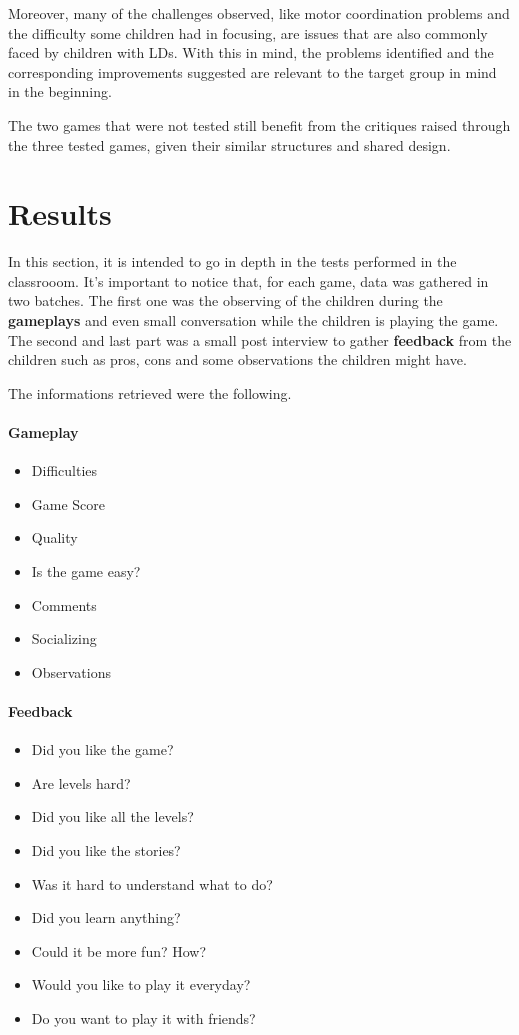 Moreover, many of the challenges observed, like motor coordination problems and the difficulty some children had in focusing, are issues that are also commonly faced by children with LDs. With this in mind, the problems identified and the corresponding improvements suggested are relevant to the target group in mind in the beginning.

The two games that were not tested still benefit from the critiques raised through the three tested games, given their similar structures and shared design.

\newpage
\section{Results}

In this section, it is intended to go in depth in the tests performed in the classrooom. It's important to notice that, for each game, data was gathered in two batches. The first one was the observing of the children during the \textbf{gameplays} and even small conversation while the children is playing the game. The second and last part was a small post interview to gather \textbf{feedback} from the children such as pros, cons and some observations the children might have.

The informations retrieved were the following.

\paragraph{Gameplay}
\begin{itemize}
    \item Difficulties
    \item Game Score
    \item Quality
    \item Is the game easy?
    \item Comments
    \item Socializing
    \item Observations
\end{itemize}

\paragraph{Feedback}
\begin{itemize}
    \item Did you like the game?
    \item Are levels hard?
    \item Did you like all the levels?
    \item Did you like the stories?
    \item Was it hard to understand what to do?
    \item Did you learn anything?
    \item Could it be more fun? How?
    \item Would you like to play it everyday?
    \item Do you want to play it with friends?
\end{itemize}


